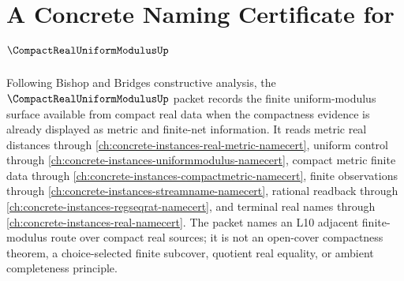 \chapter{A Concrete Naming Certificate for $\CompactRealUniformModulusUp$}
\label{ch:concrete-instances-compact-real-uniform-modulus-namecert}

Following Bishop and Bridges constructive analysis, the $\CompactRealUniformModulusUp$ packet records the finite uniform-modulus surface available from compact real data when the compactness evidence is already displayed as metric and finite-net information. It reads metric real distances through \autoref{ch:concrete-instances-real-metric-namecert}, uniform control through \autoref{ch:concrete-instances-uniformmodulus-namecert}, compact metric finite data through \autoref{ch:concrete-instances-compactmetric-namecert}, finite observations through \autoref{ch:concrete-instances-streamname-namecert}, rational readback through \autoref{ch:concrete-instances-regseqrat-namecert}, and terminal real names through \autoref{ch:concrete-instances-real-namecert}. The packet names an L10 adjacent finite-modulus route over compact real sources; it is not an open-cover compactness theorem, a choice-selected finite subcover, quotient real equality, or ambient completeness principle.

